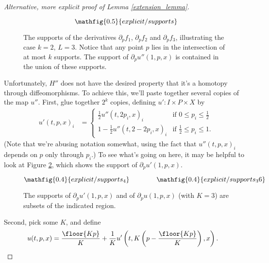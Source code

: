 \begin{proof}[Alternative, more explicit proof of Lemma \ref{extension_lemma}]
\begin{figure}[t]
\begin{equation*}
\mathfig{0.5}{explicit/supports}
\end{equation*}
\caption{The supports of the derivatives {\color{green}$\partial_p f_1$}, {\color{blue}$\partial_p f_2$} and {\color{red}$\partial_p f_3$}, illustrating the case $k=2$, $L=3$. Notice that any
point $p$ lies in the intersection of at most $k$ supports. The support of $\partial_p u''(1,p,x)$ is contained in the union of these supports.}
\label{fig:supports}
\end{figure}

Unfortunately, $H''$ does not have the desired property that it's a homotopy through diffeomorphisms. To achieve this, we'll paste together several copies
of the map $u''$. First, glue together $2^k$ copies, defining $u':I \times P \times X$ by
\begin{align*}
u'(t,p,x)_i & =
\begin{cases}
\frac{1}{2} u''(t, 2p_i, x)_i & \text{if $0 \leq p_i \leq \frac{1}{2}$} \\
1-\frac{1}{2} u''(t, 2-2p_i, x)_i & \text{if $\frac{1}{2} \leq p_i \leq 1$}.
\end{cases}
\end{align*}
(Note that we're abusing notation somewhat, using the fact that $u''(t,p,x)_i$ depends on $p$ only through $p_i$.)
To see what's going on here, it may be helpful to look at Figure \ref{fig:supports_4}, which shows the support of $\partial_p u'(1,p,x)$.
\begin{figure}[t]
\begin{equation*}
\mathfig{0.4}{explicit/supports_4} \qquad \qquad \mathfig{0.4}{explicit/supports_36}
\end{equation*}
\caption{The supports of $\partial_p u'(1,p,x)$ and of $\partial_p u(1,p,x)$ (with $K=3$) are subsets of the indicated region.}
\label{fig:supports_4}
\end{figure}

Second, pick some $K$, and define
\begin{align*}
u(t,p,x) & = \frac{\floor{K p}}{K} + \frac{1}{K} u'\left(t, K \left(p - \frac{\floor{K p}}{K}\right), x\right).
\end{align*}



\end{proof}
